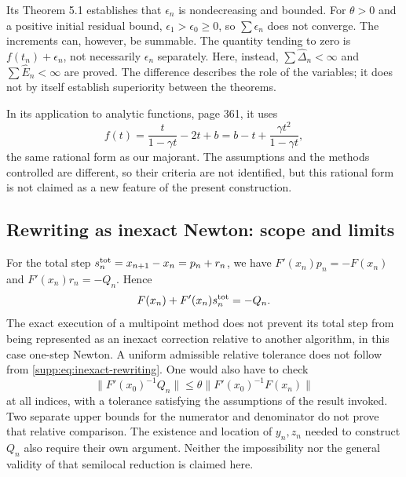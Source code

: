 \documentclass[11pt,a4paper]{article}
\numberwithin{equation}{section}
\numberwithin{table}{section}
\theoremstyle{plain}
\theoremstyle{definition}\newtheorem{definition}[theorem]{Definition}
\theoremstyle{remark}\newtheorem{remark}[theorem]{Remark}
\begin{document}
Its Theorem 5.1 establishes that $\epsilon_n$ is nondecreasing and
bounded. For $\theta>0$ and a positive initial residual bound,
$\epsilon_1>\epsilon_0\geq0$, so $\sum\epsilon_n$ does not converge.
The increments can, however, be summable. The quantity tending to
zero is $f(t_n)+\epsilon_n$, not necessarily $\epsilon_n$ separately.
Here, instead, $\sum\widehat\Delta_n<\infty$ and
$\sum\widehat E_n<\infty$ are proved.
The difference describes the role of the variables; it does not
by itself establish superiority between the theorems.

In its application to analytic functions, page 361, it uses
\[
 f(t)=\frac{t}{1-\gamma t}-2t+b
 =b-t+\frac{\gamma t^2}{1-\gamma t},
\]
the same rational form as our majorant. The assumptions and the
methods controlled are different, so their criteria are not
identified, but this rational form is not claimed as a new feature
of the present construction.

\subsection{Rewriting as inexact Newton: scope and limits}
For the total step $s_n^{\rm tot}=x_{n+1}-x_n=p_n+r_n$, we have
$F'(x_n)p_n=-F(x_n)$ and $F'(x_n)r_n=-Q_n$. Hence
\begin{equation}
 F(x_n)+F'(x_n)s_n^{\rm tot}=-Q_n.
 \label{supp:eq:inexact-rewriting}
\end{equation}
The exact execution of a multipoint method does not prevent its
total step from being represented as an inexact correction relative
to another algorithm, in this case one-step Newton.
A uniform admissible relative tolerance does not follow from
\eqref{supp:eq:inexact-rewriting}. One would also have to check
\[
 \|F'(x_0)^{-1}Q_n\|\leq\theta\|F'(x_0)^{-1}F(x_n)\|
\]
at all indices, with a tolerance satisfying the assumptions of the
result invoked. Two separate upper bounds for the numerator and
denominator do not prove that relative comparison. The existence
and location of $y_n,z_n$ needed to construct $Q_n$ also require
their own argument. Neither the impossibility nor the general
validity of that semilocal reduction is claimed here.
\end{document}
